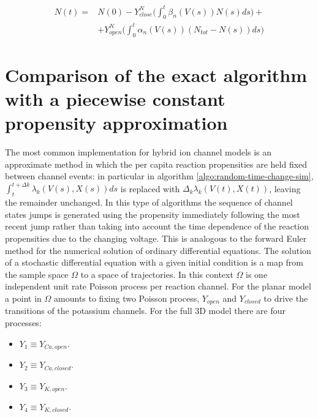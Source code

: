 	\begin{align*}
		N(t) =&N(0) - Y_{close}^N\biggl(\int_0^t\beta_n(V(s))N(s)ds\biggr)+\\
					&+Y_{open}^N\biggl(\int_0^t\alpha_n(V(s))(N_{tot}-N(s))ds\biggr)
	\end{align*}

\section{Comparison of the exact algorithm with a piecewise constant propensity approximation}
The most common implementation for hybrid ion channel models is an approximate method in which the per capita reaction propensities are held fixed between channel events: in particular in algorithm \ref{algo:random-time-change-sim}, $\int_t^{t+\Delta k}\lambda_k(V(s), X(s))ds$ is replaced with $\Delta_k\lambda_k(V(t), X(t))$, leaving the remainder unchanged.
In this type of algorithms the sequence of channel states jumps is generated using the propensity immediately following the most recent jump rather than taking into account the time dependence of the reaction propensities due to the changing voltage.
This is analogous to the forward Euler method for the numerical solution of ordinary differential equations.
The solution of a stochastic differential equation with a given initial condition is a map from the sample space $\Omega$ to a space of trajectories.
In this context $\Omega$ is one independent unit rate Poisson process per reaction channel.
For the planar model a point in $\Omega$ amounts to fixing two Poisson process, $Y_{open}$ and $Y_{closed}$ to drive the transitions of the potassium channels.
For the full 3D model there are four processes:

\begin{multicols}{2}
	\begin{itemize}
		\item $Y_1 \equiv Y_{Ca, open}$.
		\item $Y_2 \equiv Y_{Ca, closed}$.
		\item $Y_3 \equiv Y_{K, open}$.
		\item $Y_4 \equiv Y_{K, closed}$.
	\end{itemize}
\end{multicols}

